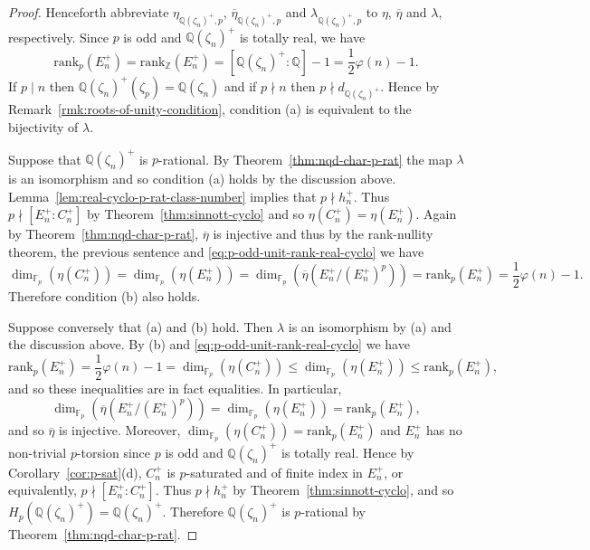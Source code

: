 \documentclass[10pt,a4paper]{amsart}
\newcommand{\F}{\mathbb{F}}
\newcommand{\Q}{\mathbb{Q}}
\newcommand{\Z}{\mathbb{Z}}
\newcommand{\rank}{\mathrm{rank}}
\begin{document}
\begin{proof}
Henceforth abbreviate $\eta_{\Q(\zeta_{n})^{+},p}$, $\overline{\eta}_{\Q(\zeta_{n})^{+},p}$
and $\lambda_{\Q(\zeta_{n})^{+},p}$ to 
$\eta$, $\overline{\eta}$ and $\lambda$,
respectively.
Since $p$ is odd and $\Q(\zeta_{n})^{+}$ is totally real, we have
\begin{equation}\label{eq:p-odd-unit-rank-real-cyclo}
\rank_{p}(E_{n}^{+}) 
= \rank_{\Z}(E_{n}^{+})
= [\Q(\zeta_{n})^{+}:\Q] -1 
= \textstyle{\frac{1}{2}}\varphi(n)-1.
\end{equation}
If $p \mid n$ then $\Q(\zeta_{n})^{+}(\zeta_{p})=\Q(\zeta_{n})$ and if $p \nmid n$ then
$p \nmid d_{\Q(\zeta_{n})^{+}}$. Hence by Remark~\ref{rmk:roots-of-unity-condition}, 
condition 
(a) is equivalent to the bijectivity of $\lambda$.

Suppose that $\Q(\zeta_{n})^{+}$ is $p$-rational. 
By Theorem~\ref{thm:nqd-char-p-rat} 
the map $\lambda$ is an isomorphism and so condition (a) holds
by the discussion above.
Lemma~\ref{lem:real-cyclo-p-rat-class-number} implies that $p \nmid h_{n}^{+}$.
Thus $p \nmid [E_{n}^{+} : C_{n}^{+}]$ by Theorem~\ref{thm:sinnott-cyclo} and
so $\eta(C_{n}^{+}) = \eta(E_{n}^{+})$.
Again by Theorem~\ref{thm:nqd-char-p-rat}, $\overline{\eta}$ is injective
and thus by the rank-nullity theorem, the previous sentence and \eqref{eq:p-odd-unit-rank-real-cyclo} we have 
\[
\dim_{\F_{p}}(\eta(C_{n}^{+}))
=
\dim_{\F_{p}}(\eta(E_{n}^{+}))
=
\dim_{\F_{p}}(\overline{\eta}(E_{n}^{+}/(E_{n}^{+})^{p}))
=
\rank_{p}(E_{n}^{+})
= 
\textstyle{\frac{1}{2}}\varphi(n)-1.
\]
Therefore condition (b) also holds.

Suppose conversely that (a) and (b) hold. 
Then $\lambda$ is an isomorphism by (a) and the discussion above.
By (b) and \eqref{eq:p-odd-unit-rank-real-cyclo} we have
\[
\rank_{p}(E_{n}^{+})
=
\textstyle{\frac{1}{2}}\varphi(n)-1
= 
\dim_{\F_{p}}(\eta(C_{n}^{+}))
\leq 
\dim_{\F_{p}}(\eta(E_{n}^{+})) 
\leq 
\rank_{p}(E_{n}^{+}),
\]
and so these inequalities are in fact equalities. 
In particular, 
\[
\dim_{\F_{p}}(\overline{\eta}(E_{n}^{+}/(E_{n}^{+})^{p})) 
= \dim_{\F_{p}}(\eta(E_{n}^{+}))
=\rank_{p}(E_{n}^{+}),
\]
and so $\overline{\eta}$ is injective.
Moreover, 
$\dim_{\F_{p}}(\eta(C_{n}^{+}))=\rank_{p}(E_{n}^{+})$
and $E_{n}^{+}$ has no non-trivial $p$-torsion since $p$ is odd and $\Q(\zeta_{n})^{+}$
is totally real. Hence by Corollary~\ref{cor:p-sat}(d), 
$C_{n}^{+}$ is $p$-saturated and of finite index in $E_{n}^{+}$, 
or equivalently, $p \nmid [E_{n}^{+}:C_{n}^{+}]$.
Thus $p \nmid h_{n}^{+}$ by Theorem~\ref{thm:sinnott-cyclo},
and so $H_{p}(\Q(\zeta_{n})^{+})=\Q(\zeta_{n})^{+}$.
Therefore $\Q(\zeta_{n})^{+}$ is $p$-rational by Theorem~\ref{thm:nqd-char-p-rat}.
\end{proof}
\end{document}
